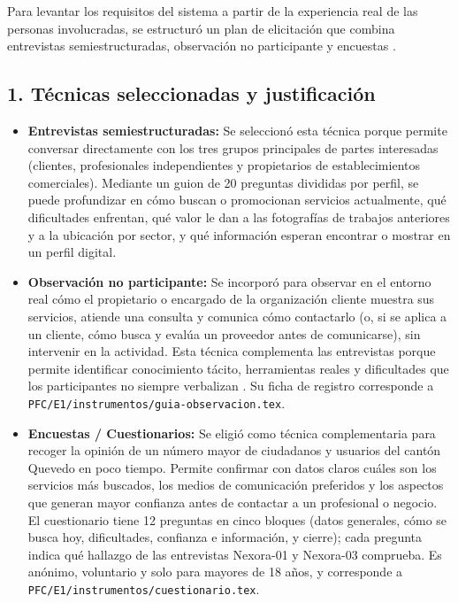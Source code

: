 \documentclass[11pt,a4paper]{article}
\begin{document}
Para levantar los requisitos del sistema a partir de la experiencia real de las personas involucradas, se estructur\'o un plan de elicitaci\'on que combina entrevistas semiestructuradas, observaci\'on no participante y encuestas \cite{wiegers2013, pohl2025}.

\subsection*{1. T\'ecnicas seleccionadas y justificaci\'on}
\begin{itemize}[leftmargin=1.5em, itemsep=3pt]
    \item \textbf{Entrevistas semiestructuradas:} Se seleccion\'o esta t\'ecnica porque permite conversar directamente con los tres grupos principales de partes interesadas (clientes, profesionales independientes y propietarios de establecimientos comerciales). Mediante un guion de 20 preguntas divididas por perfil, se puede profundizar en c\'omo buscan o promocionan servicios actualmente, qu\'e dificultades enfrentan, qu\'e valor le dan a las fotograf\'ias de trabajos anteriores y a la ubicaci\'on por sector, y qu\'e informaci\'on esperan encontrar o mostrar en un perfil digital.
    \item \textbf{Observaci\'on no participante:} Se incorpor\'o para observar en el entorno real c\'omo el propietario o encargado de la organizaci\'on cliente muestra sus servicios, atiende una consulta y comunica c\'omo contactarlo (o, si se aplica a un cliente, c\'omo busca y eval\'ua un proveedor antes de comunicarse), sin intervenir en la actividad. Esta t\'ecnica complementa las entrevistas porque permite identificar conocimiento t\'acito, herramientas reales y dificultades que los participantes no siempre verbalizan \cite{pohl2025, ireb2026}. Su ficha de registro corresponde a \texttt{PFC/E1/instrumentos/guia-observacion.tex}.
    \item \textbf{Encuestas / Cuestionarios:} Se eligi\'o como t\'ecnica complementaria para recoger la opini\'on de un n\'umero mayor de ciudadanos y usuarios del cant\'on Quevedo en poco tiempo. Permite confirmar con datos claros cu\'ales son los servicios m\'as buscados, los medios de comunicaci\'on preferidos y los aspectos que generan mayor confianza antes de contactar a un profesional o negocio. El cuestionario tiene 12 preguntas en cinco bloques (datos generales, c\'omo se busca hoy, dificultades, confianza e informaci\'on, y cierre); cada pregunta indica qu\'e hallazgo de las entrevistas Nexora-01 y Nexora-03 comprueba. Es an\'onimo, voluntario y solo para mayores de 18 a\~nos, y corresponde a \texttt{PFC/E1/\allowbreak instrumentos/\allowbreak cuestionario.tex}.
\end{itemize}
\end{document}
